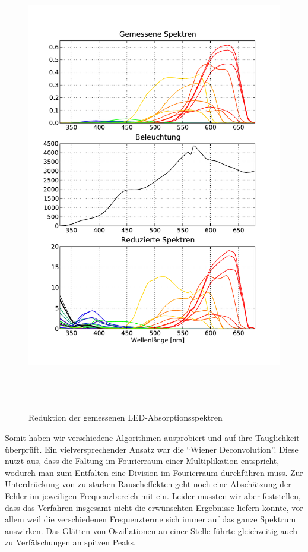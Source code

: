 \documentclass[11pt]{scrartcl}
\begin{document}
\begin{figure}[H]
\begin{center}
\includegraphics[height=20cm]{spektren_mit_halogen.pdf}
\end{center}
\vspace{-1.5\baselineskip}
\caption{Reduktion der gemessenen LED-Absorptionsspektren}
\label{fig:reduktion}
\end{figure}

Somit haben wir verschiedene Algorithmen ausprobiert und auf ihre Tauglichkeit überprüft.
Ein vielversprechender Ansatz war die "`Wiener Deconvolution"'.
Diese nutzt aus, dass die Faltung im Fourierraum einer Multiplikation entspricht, wodurch man zum Entfalten eine Division im Fourierraum durchführen muss.
Zur Unterdrückung von zu starken Rauscheffekten geht noch eine Abschätzung der Fehler im jeweiligen Frequenzbereich mit ein.
Leider mussten wir aber feststellen, dass das Verfahren insgesamt nicht die erwünschten Ergebnisse liefern konnte, vor allem weil die verschiedenen Frequenzterme sich immer auf das ganze Spektrum auswirken.
Das Glätten von Oszillationen an einer Stelle führte gleichzeitig auch zu Verfälschungen an spitzen Peaks.
\end{document}
